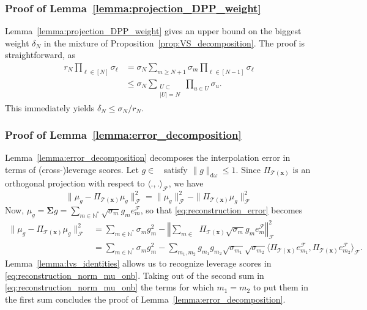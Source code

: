 \documentclass[twoside,11pt]{book}
\numberwithin{theorem}{chapter}
\numberwithin{definition}{chapter}
\numberwithin{proposition}{chapter}
\numberwithin{corollary}{chapter}
\numberwithin{example}{chapter}
\numberwithin{lemma}{chapter}
\DeclareMathOperator{\F}{\mathcal{F}}
\DeclareMathOperator{\Ltwo}{\mathbb{L}_{2}(\mathrm{d} \omega)}
\DeclareMathOperator{\Ns}{\mathbb{N}^{*}}
\begin{document}
\subsubsection{Proof of Lemma~\ref{lemma:projection_DPP_weight}}
Lemma~\ref{lemma:projection_DPP_weight} gives an upper bound on the biggest weight $\delta_N$ in the mixture of Proposition~\ref{prop:VS_decomposition}. The proof is straightforward, as
\begin{align}\label{eq:r_N_delta_N_inequality}
r_{N} \prod\limits_{\ell \in [N]} \sigma_{\ell} & = \sigma_{N} \sum\limits_{m \geq N+1} \sigma_{m} \prod\limits_{\ell \in [N-1]} \sigma_{\ell} \nonumber\\
& \leq \sigma_{N} \sum\limits_{\substack{U \subset \Ns\\ |U| = N}} \prod\limits_{u \in U} \sigma_{u}.
\end{align}
This immediately yields $\delta_{N} \leq \sigma_{N}/r_{N}$.

\subsubsection{Proof of Lemma~\ref{lemma:error_decomposition}}\label{app:proof_error_decomposition}
Lemma~\ref{lemma:error_decomposition} decomposes the interpolation error in terms of (cross-)leverage scores. Let $g \in \Ltwo$ satisfy $\|g\|_{\mathrm{d}\omega} \leq 1$. Since $\Pi_{\mathcal{T}(\bm{x})}$ is an orthogonal projection with respect to $\langle .,. \rangle_{\F}$, we have
\begin{equation}\label{eq:reconstruction_error}
\|\mu_{g} - \Pi_{\mathcal{T}(\bm{x})} \mu_{g}\|_{\F}^{2} = \|\mu_{g}\|_{\F}^{2} - \| \Pi_{\mathcal{T}(\bm{x})} \mu_{g}\|_{\F}^2
\end{equation}
Now, $\mu_{g} = \bm{\Sigma} g = \sum\limits_{m \in \mathbb{N}^{*}} \sqrt{\sigma_{m}} g_{m} e_{m}^{\F}$, so that \eqref{eq:reconstruction_error} becomes
\begin{align}
\|\mu_{g} - \Pi_{\mathcal{T}(\bm{x})} \mu_{g}\|_{\F}^{2} & = \sum\limits_{m \in \mathbb{N}^{*}} \sigma_{m} g_{m}^{2} - \left\Vert \sum_{m \in \Ns} \Pi_{\mathcal{T}(\bm{x})}  \sqrt{\sigma_{m}} g_{m} e_{m}^{\F}\right\Vert_{\F}^2 \nonumber\\
& = \sum\limits_{m \in \mathbb{N}^{*}} \sigma_{m} g_{m}^{2} - \sum\limits_{m_{1}, m_2} g_{m_{1}} g_{m_{2}} \sqrt{\sigma_{m_{1}}} \sqrt{\sigma_{m_{2}}} \langle  \Pi_{\mathcal{T}(\bm{x})}   e_{m_{1}}^{\F}, \Pi_{\mathcal{T}(\bm{x})} e_{m_{2}}^{\F} \rangle_{\F}. \label{eq:reconstruction_norm_mu_onb}
\end{align}
Lemma~\ref{lemma:lvs_identities} allows us to recognize leverage scores in \eqref{eq:reconstruction_norm_mu_onb}. Taking out of the second sum in \eqref{eq:reconstruction_norm_mu_onb} the terms for which $m_1=m_2$ to put them in the first sum concludes the proof of Lemma~\ref{lemma:error_decomposition}.
\end{document}
